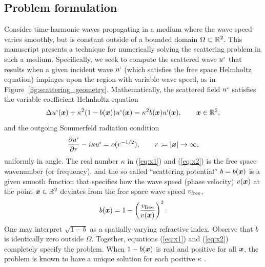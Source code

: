 \documentclass[11pt,final]{amsart}
\theoremstyle{definition}
\numberwithin{remark}{section}
\numberwithin{definition}{section}
\numberwithin{pro}{section}
\begin{document}
\subsection{Problem formulation}
\label{sec:formulation}
Consider time-harmonic waves propagating in a medium where the wave speed varies smoothly, but
is constant outside of a bounded domain $\Omega\subset\mathbb{R}^2$. This manuscript presents a technique
for numerically solving the scattering problem in such a medium.  Specifically, we
seek to compute the scattered wave $u^{\mbox{\tiny s}}$ that results when a given incident wave $u^{\mbox{\tiny i}}$
(which satisfies the free space Helmholtz equation) impinges upon the region with variable wave speed,
as in Figure~\ref{fig:scattering_geometry}.
Mathematically, the scattered field $u^{\mbox{\tiny s}}$ satisfies the variable coefficient Helmholtz equation
\begin{equation}
\label{eq:x1}
\Delta u^{\mbox{\tiny s}}(\bm{x}) + \kappa^{2}(1 - b(\bm{x}))u^{\mbox{\tiny s}}(\bm{x}) = \kappa^{2}b(\bm{x})u^{\mbox{\tiny i}}(\bm{x}),\qquad\bm{x} \in \mathbb{R}^{2},
\end{equation}
and the outgoing Sommerfeld radiation condition
\begin{equation}
\label{eq:x2}
\frac{\partial u^{\mbox{\tiny s}}}{\partial r} - i \kappa u^{\mbox{\tiny s}} = o(r^{-1/2}), \qquad r:=|\bm{x}| \to \infty,
\end{equation}
uniformly in angle. The real number $\kappa$ in (\ref{eq:x1}) and (\ref{eq:x2}) is the free space
wavenumber (or frequency),
and the so called ``scattering potential'' $b = b(\bm{x})$ is a given smooth function that specifies
how the wave speed (phase velocity)
$v(\bm{x})$ at the point $\bm{x} \in \mathbb{R}^{2}$ deviates from the free space
wave speed $v_{\rm free}$,
\begin{equation}
\label{eq:def_b}
b(\bm{x}) = 1 - \left(\frac{v_{\rm free}}{v(\bm{x})}\right)^{2}.
\end{equation}
One may interpret $\sqrt{1-b}$ as a spatially-varying refractive index.
Observe that $b$ is identically zero outside $\Omega$.  Together, equations (\ref{eq:x1}) and (\ref{eq:x2})
completely specify the problem.
When $1-b(\bm{x})$ is real and positive for all $\bm{x}$,
the problem is known to have a unique solution for each positive $\kappa$
\cite[Thm.~8.7]{coltonkress}.


\end{document}
